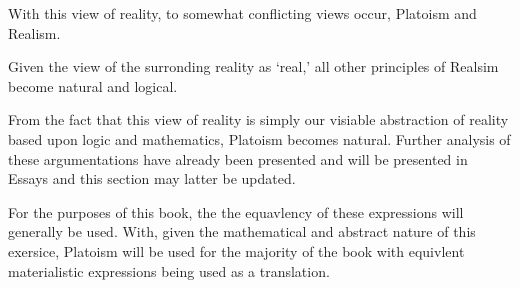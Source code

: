 With this view of reality, to somewhat conflicting views occur, Platoism and Realism.

Given the view of the surronding reality as `real,' all other principles of Realsim become natural and logical.

From the fact that this view of reality is simply our visiable abstraction of reality based upon logic and mathematics, Platoism becomes natural.
Further analysis of these argumentations have already been presented and will be presented in Essays and this section may latter be updated.

For the purposes of this book, the the equavlency of these expressions will generally be used. With, given the mathematical and abstract nature of this
exersice, Platoism will be used for the majority of the book with equivlent materialistic expressions being used as a translation.
